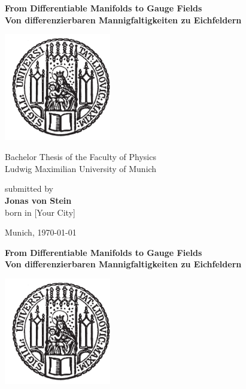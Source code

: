\documentclass[a4paper,11pt,twoside,openright]{report}
\newcommand{\thesistitle}{From Differentiable Manifolds to Gauge Fields\\\large Von differenzierbaren Mannigfaltigkeiten zu Eichfeldern}
\newcommand{\authorname}{Jonas von Stein}
\newcommand{\thesisdate}{\today}
\begin{document}
\begin{titlepage}
  \begin{center}
    \vspace*{0.65cm}
    \huge
    \hspace*{-0.73cm}
    \textbf{\thesistitle}\\
    \vspace*{2.2cm}

    \includegraphics[width=0.35\textwidth]{figures/lmu_siege1.pdf}

    \vspace*{0.5cm}
    \Large
    Bachelor Thesis of the Faculty of Physics\\
    Ludwig Maximilian University of Munich

    \vspace*{3.5cm}
    \large
    submitted by\\[0.1cm]
    \Large \textbf{\authorname}\\
    \large born in [Your City] %

    \vspace*{2.5cm}
    Munich, \thesisdate
  \end{center}

\newpage

  \begin{center}
    \vspace*{0.65cm}
    \huge
    \hspace*{-0.73cm}
    \textbf{\thesistitle}\\
    \vspace*{2.2cm}

    \includegraphics[width=0.35\textwidth]{figures/lmu_siege1.pdf}


\end{center}
\end{titlepage}
\end{document}
